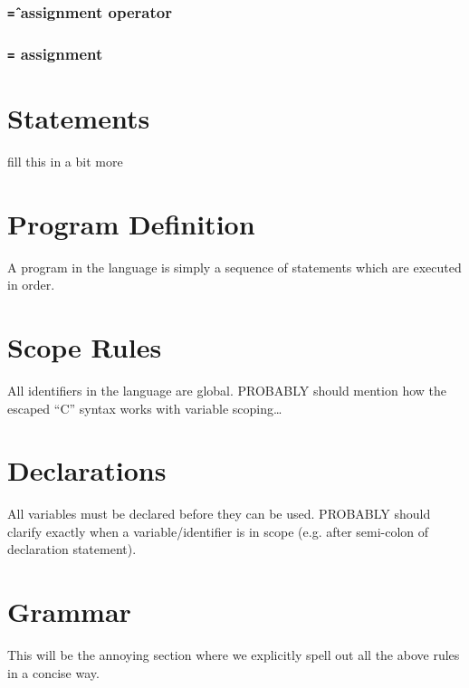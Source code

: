 \subsubsection{\texttt{\^=} assignment operator}

\subsubsection{\texttt{=} assignment}

\section{Statements}
\label{sec:statements}
fill this in a bit more

\section{Program Definition}
A program in the \sys{} language is simply a sequence of statements which
are executed in order.

\section{Scope Rules}
All identifiers in the \sys{} language are global.
PROBABLY should mention how the escaped ``C'' syntax works with variable scoping\ldots

\section{Declarations}
All variables must be declared before they can be used.
PROBABLY should clarify exactly when a variable/identifier is in scope (e.g. after semi-colon of declaration statement).

\section{Grammar}
This will be the annoying section where we explicitly spell out all the above rules
in a concise way.